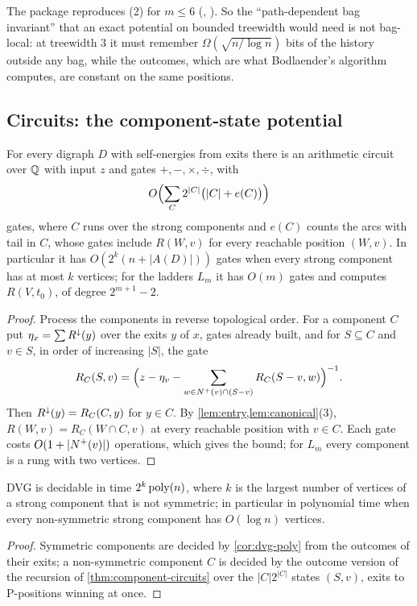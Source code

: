 The package reproduces (2) for $m\le6$ (, ). So the ``path-dependent bag invariant'' that an exact potential on bounded treewidth would need is not bag-local: at treewidth $3$ it must remember $\Omega(\sqrt{n/\log n})$ bits of the history outside any bag, while the outcomes, which are what Bodlaender's algorithm computes, are constant on the same positions.

\subsection{Circuits: the component-state potential}\label{ssec:circuits}

\begin{theorem}\label{thm:component-circuits}
For every digraph $D$ with self-energies from exits there is an arithmetic circuit over $\QQ$ with input $z$ and gates $+,-,\times,\div$, with
\[
O\Bigl(\sum_{C}2^{|C|}\bigl(|C|+e(C)\bigr)\Bigr)
\]
gates, where $C$ runs over the strong components and $e(C)$ counts the arcs with tail in $C$, whose gates include $R(W,v)$ for every reachable position $(W,v)$. In particular it has $O(2^{k}(n+|A(D)|))$ gates when every strong component has at most $k$ vertices; for the ladders $L_m$ it has $O(m)$ gates and computes $R(V,t_0)$, of degree $2^{m+1}-2$.
\end{theorem}
\begin{proof}
Process the components in reverse topological order. For a component $C$ put $\eta_x=\sum\Rdown(y)$ over the exits $y$ of $x$, gates already built, and for $S\subseteq C$ and $v\in S$, in order of increasing $|S|$, the gate
\[
R_C(S,v)=\Bigl(z-\eta_v-\sum_{w\in\nplus(v)\cap(S-v)}R_C(S-v,w)\Bigr)^{-1}.
\]
Then $\Rdown(y)=R_C(C,y)$ for $y\in C$. By \cref{lem:entry,lem:canonical}(3), $R(W,v)=R_C(W\cap C,v)$ at every reachable position with $v\in C$. Each gate costs $O(1+|\nplus(v)|)$ operations, which gives the bound; for $L_m$ every component is a rung with two vertices.
\end{proof}

\begin{corollary}\label{cor:small-components}
DVG is decidable in time $2^{k}\poly(n)$, where $k$ is the largest number of vertices of a strong component that is not symmetric; in particular in polynomial time when every non-symmetric strong component has $O(\log n)$ vertices.
\end{corollary}
\begin{proof}
Symmetric components are decided by \cref{cor:dvg-poly} from the outcomes of their exits; a non-symmetric component $C$ is decided by the outcome version of the recursion of \cref{thm:component-circuits} over the $|C|2^{|C|}$ states $(S,v)$, exits to P-positions winning at once.
\end{proof}

